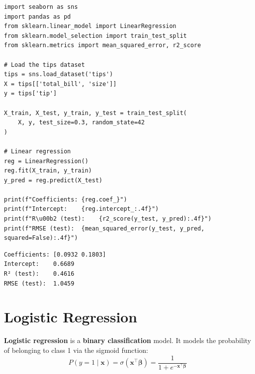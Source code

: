 \begin{codeblock}[title=\textbf{Python}]
\begin{verbatim}
import seaborn as sns
import pandas as pd
from sklearn.linear_model import LinearRegression
from sklearn.model_selection import train_test_split
from sklearn.metrics import mean_squared_error, r2_score

# Load the tips dataset
tips = sns.load_dataset('tips')
X = tips[['total_bill', 'size']]
y = tips['tip']

X_train, X_test, y_train, y_test = train_test_split(
    X, y, test_size=0.3, random_state=42
)

# Linear regression
reg = LinearRegression()
reg.fit(X_train, y_train)
y_pred = reg.predict(X_test)

print(f"Coefficients: {reg.coef_}")
print(f"Intercept:    {reg.intercept_:.4f}")
print(f"R\u00b2 (test):    {r2_score(y_test, y_pred):.4f}")
print(f"RMSE (test):  {mean_squared_error(y_test, y_pred, squared=False):.4f}")
\end{verbatim}
\end{codeblock}

\begin{codeoutput}
\begin{verbatim}
Coefficients: [0.0932 0.1803]
Intercept:    0.6689
R² (test):    0.4616
RMSE (test):  1.0459
\end{verbatim}
\end{codeoutput}

\section{Logistic Regression}
\label{sec:regression_logistique}


\begin{definition}
\textbf{Logistic regression} is a \textbf{binary classification} model. It models the probability of belonging to class 1 via the sigmoid function:
\[
P(y=1 \mid \mathbf{x}) = \sigma(\mathbf{x}^\top \boldsymbol{\beta}) = \frac{1}{1 + e^{-\mathbf{x}^\top \boldsymbol{\beta}}}
\]
\end{definition}

\begin{center}
\end{center}


